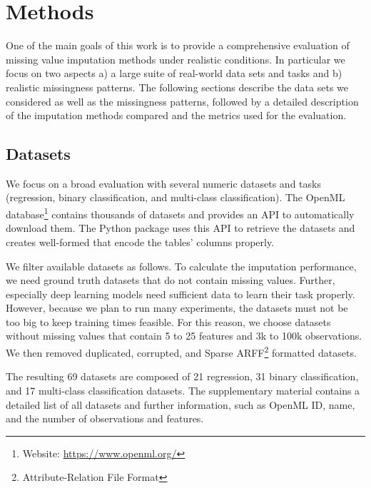 
\section{Methods}
\label{sec:methods}
%
One of the main goals of this work is to provide a comprehensive evaluation of missing value imputation methods under realistic conditions. In particular we focus on two aspects a) a large suite of real-world data sets and tasks and b) realistic missingness patterns. The following sections describe the data sets we considered as well as the missingness patterns, followed by a detailed description of the imputation methods compared and the metrics used for the evaluation.

\subsection{Datasets}
%
We focus on a broad evaluation with several numeric datasets and tasks (regression, binary classification, and multi-class classification). The OpenML database\footnote{Website: \url{https://www.openml.org/}} contains thousands of datasets and provides an API to automatically download them. The Python package  uses this API to retrieve the datasets and creates well-formed  that encode the tables' columns properly.

We filter available datasets as follows. To calculate the imputation performance, we need ground truth datasets that do not contain missing values. Further, especially deep learning models need sufficient data to learn their task properly. However, because we plan to run many experiments, the datasets must not be too big to keep training times feasible. For this reason, we choose datasets without missing values that contain 5 to 25 features and 3k to 100k observations. We then removed duplicated, corrupted, and Sparse ARFF\footnote{Attribute-Relation File Format} formatted datasets.

The resulting 69 datasets are composed of 21 regression, 31 binary classification, and 17 multi-class classification datasets. The supplementary material contains a detailed list of all datasets and further information, such as OpenML ID, name, and the number of observations and features.


